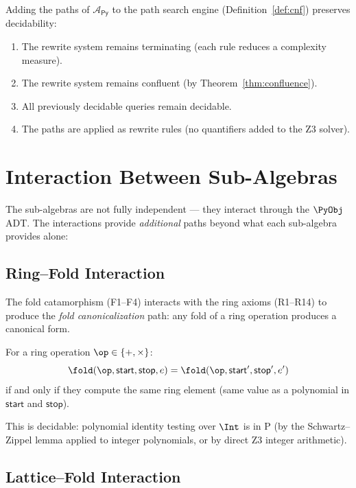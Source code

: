 \begin{theorem}
\label{thm:algebra-decidable}
Adding the paths of $\mathcal{A}_\mathsf{Py}$ to the path search
engine (Definition~\ref{def:cnf}) preserves decidability:
\begin{enumerate}
  \item The rewrite system remains terminating (each rule reduces
    a complexity measure).
  \item The rewrite system remains confluent (by Theorem~\ref{thm:confluence}).
  \item All previously decidable queries remain decidable.
  \item The paths are applied as rewrite rules (no quantifiers
    added to the Z3 solver).
\end{enumerate}
\end{theorem}

\section{Interaction Between Sub-Algebras}

The sub-algebras are not fully independent --- they interact through
the $\PyObj$ ADT.  The interactions provide \emph{additional} paths
beyond what each sub-algebra provides alone:

\subsection{Ring--Fold Interaction}

The fold catamorphism (F1--F4) interacts with the ring axioms (R1--R14)
to produce the \emph{fold canonicalization} path: any fold of a ring
operation produces a canonical form.

\begin{theorem}
\label{thm:fold-canon}
For a ring operation $\op \in \{+, \times\}$:
\[
  \fold(\op, \mathsf{start}, \mathsf{stop}, e) =
  \fold(\op, \mathsf{start}', \mathsf{stop}', e')
\]
if and only if they compute the same ring element
(same value as a polynomial in $\mathsf{start}$ and $\mathsf{stop}$).

This is decidable: polynomial identity testing over $\Int$ is in P
(by the Schwartz--Zippel lemma applied to integer polynomials, or
by direct Z3 integer arithmetic).
\end{theorem}

\subsection{Lattice--Fold Interaction}

